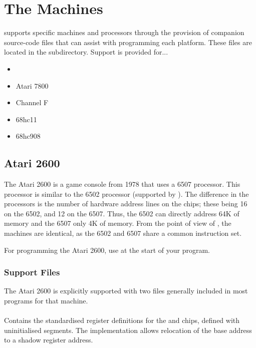 \fi




\chapter{The Machines}

\dasm supports specific machines and processors through the provision of companion source-code files that can assist with programming each platform. These files are located in the  subdirectory. Support is provided for...

\begin{itemize}
\item {}
\item Atari 7800
\item Channel F
\item 68hc11
\item 68hc908
\end{itemize}


\section{Atari 2600}
\label{machine:atari2600}

The Atari 2600 is a game console from 1978 that uses a 6507 processor. This processor is similar to the 6502 processor (supported by \dasm). The difference in the processors is the number of hardware address lines on the chips; these being 16 on the 6502, and 12 on the 6507. Thus, the 6502 can directly address 64K of memory and the 6507 only 4K of memory.  From the point of view of \dasm, the machines are identical, as the 6502 and 6507 share a common instruction set.

For programming the Atari 2600, use  at the start of your program.

\subsection{Support Files}

The Atari 2600 is explicitly supported with two files generally included in most programs for that machine.

\subsubsection{}

Contains the standardised register definitions for the  and  chips, defined with uninitialised segments. The implementation allows relocation of the  base address to a shadow register address.

